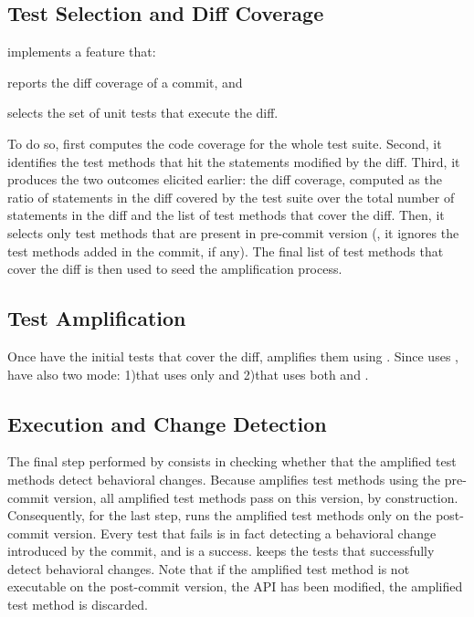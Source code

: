 \subsection{Test Selection and Diff Coverage}
\label{subsec:compute_diff_coverage}
\DCI implements a feature that:
\begin{enumerate*}
\item reports the diff coverage of a commit, and
\item selects the set of unit tests that execute the diff.
\end{enumerate*}
%
To do so, \DCI first computes the code coverage for the whole test suite.
Second, it identifies the test methods that hit the statements modified by the diff. 
Third, it produces the two outcomes elicited earlier: the diff coverage, computed as the ratio of statements in the diff covered by the test suite over the total number of statements in the diff and the list of test methods that cover the diff.
%
Then, it selects only test methods that are present in pre-commit version (\ie, it ignores the test methods added in the commit, if any).
The final list of test methods that cover the diff is then used to seed the amplification process.

\subsection{Test Amplification}
\label{sec:dci:techniques:amplification}

Once \DCI have the initial tests that cover the diff, \DCI amplifies them using \dspot.
Since \DCI uses \dspot, \DCI have also two mode:
1)\DCIA that uses only \Aampl and
2)\DCII that uses both \Aampl and \Iampl.

\subsection{Execution and Change Detection}
\label{sec:dci:techniques:execution-change-detection}

The final step performed by \DCI consists in checking whether that the amplified test methods detect behavioral changes.
Because \DCI amplifies test methods using the pre-commit version, all amplified test methods pass on this version, by construction. 
Consequently, for the last step, \DCI runs the amplified test methods only on the post-commit version. 
Every test that fails is in fact detecting a behavioral change introduced by the commit, and is a success.
\DCI keeps the tests that successfully detect behavioral changes.
Note that if the amplified test method is not executable on the post-commit version, \eg the API has been modified, the amplified test method is discarded.

